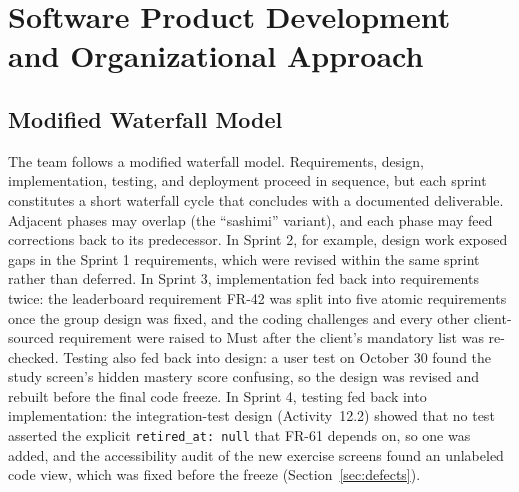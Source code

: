 \documentclass[12pt,letterpaper]{article}
\begin{document}
\section{Software Product Development and Organizational Approach}\label{sec:process}

\subsection{Modified Waterfall Model}
The team follows a modified waterfall model. Requirements, design, implementation,
testing, and deployment proceed in sequence, but each sprint constitutes a short
waterfall cycle that concludes with a documented deliverable. Adjacent phases may
overlap (the ``sashimi'' variant), and each phase may feed corrections back to its
predecessor. In Sprint 2, for example, design work exposed gaps in the Sprint 1
requirements, which were revised within the same sprint rather than deferred. In
Sprint 3, implementation fed back into requirements twice: the leaderboard requirement
FR-42 was split into five atomic requirements once the group design was fixed, and the
coding challenges and every other client-sourced requirement were raised to Must after
the client's mandatory list was re-checked. Testing also fed back into design: a user test on October 30 found the
study screen's hidden mastery score confusing, so the design was revised and rebuilt
before the final code freeze. In Sprint 4, testing fed back into implementation: the
integration-test design (Activity~12.2) showed that no test asserted the explicit
\texttt{retired\_at: null} that FR-61 depends on, so one was added, and the
accessibility audit of the new exercise screens found an unlabeled code view, which
was fixed before the freeze (Section~\ref{sec:defects}).
\end{document}
